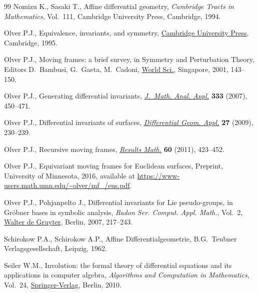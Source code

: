 \documentclass[10pt,a4paper]{amsart}
\numberwithin{equation}{section}
\begin{document}
\begin{thebibliography}{99}
Nomizu K., Sasaki T., Affine differential geometry, \textit{Cambridge Tracts in
 Mathematics}, Vol.~111, Cambridge University Press, Cambridge, 1994.

Olver P.J., Equivalence, invariants, and symmetry, \href{https://doi.org/10.1017/CBO9780511609565}{Cambridge University Press},
 Cambridge, 1995.

Olver P.J., Moving frames: a brief survey, in Symmetry and Perturbation Theory,
 Editors D.~Bambusi, G.~Gaeta, M.~Cadoni, \href{https://doi.org/10.1142/9789812794543_0020}{World Sci.}, Singapore, 2001,
 143--150.

Olver P.J., Generating differential invariants, \href{https://doi.org/10.1016/j.jmaa.2006.12.029}{\textit{J.~Math. Anal. Appl.}}
 \textbf{333} (2007), 450--471.

Olver P.J., Differential invariants of surfaces, \href{https://doi.org/10.1016/j.difgeo.2008.06.020}{\textit{Differential Geom.
 Appl.}} \textbf{27} (2009), 230--239.

Olver P.J., Recursive moving frames, \href{https://doi.org/10.1007/s00025-011-0153-6}{\textit{Results Math.}} \textbf{60} (2011),
 423--452.

Olver P.J., Equivariant moving frames for Euclidean surfaces, {P}reprint,
 University of Minnesota, 2016, available at
 \url{https://www-users.math.umn.edu/~olver/mf_/eus.pdf}.

Olver P.J., Pohjanpelto J., Differential invariants for {L}ie pseudo-groups, in
 Gr\"obner bases in symbolic analysis, \textit{Radon Ser. Comput. Appl.
 Math.}, Vol.~2, \href{https://doi.org/10.1515/9783110922752}{Walter de Gruyter}, Berlin, 2007, 217--243.

Schirokow P.A., Schirokow A.P., Affine {D}ifferentialgeometrie, B.G.~Teubner
 Verlagsgesellschaft, Leipzig, 1962.

Seiler W.M., Involution: the formal theory of differential equations and its
 applications in computer algebra, \textit{Algorithms and Computation in
 Mathematics}, Vol.~24, \href{https://doi.org/10.1007/978-3-642-01287-7}{Springer-Verlag}, Berlin, 2010.

\end{thebibliography}
\end{document}
